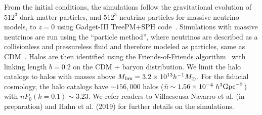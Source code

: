 From the initial conditions, 
the simulations follow the gravitational evolution of $512^3$ dark matter
particles, and $512^3$ neutrino particles for massive neutrino models, to 
$z=0$ using {\sc Gadget-III} TreePM+SPH code~\citep{springel2005}. 
Simulations with massive neutrinos are run using the ``particle method'', 
where neutrinos are described as a collisionless and pressureless fluid 
and therefore modeled as particles, same as CDM~\citep{brandbyge2008,viel2010}.
Halos are then identified using the Friends-of-Friends algorithm~\citep[FoF;][]{davis1985} 
with linking length $b=0.2$ on the CDM + baryon distribution. We limit 
the halo catalogs to halos with masses above 
$M_{\rm lim} = 3.2\times 10^{13} h^{-1}M_\odot$.
For the fiducial cosmology, the halo catalogs have ${\sim}156,000$ halos 
($\bar{n} \sim 1.56 \times 10^{-4}~h^3{\rm Gpc}^{-3}$) with $\bar{n} P_0(k=0.1)\sim 3.23$. 
We refer readers to Villaescusa-Navarro et al. (in preparation) and Hahn et al. (2019) 
for further details on the \quij simulations.

